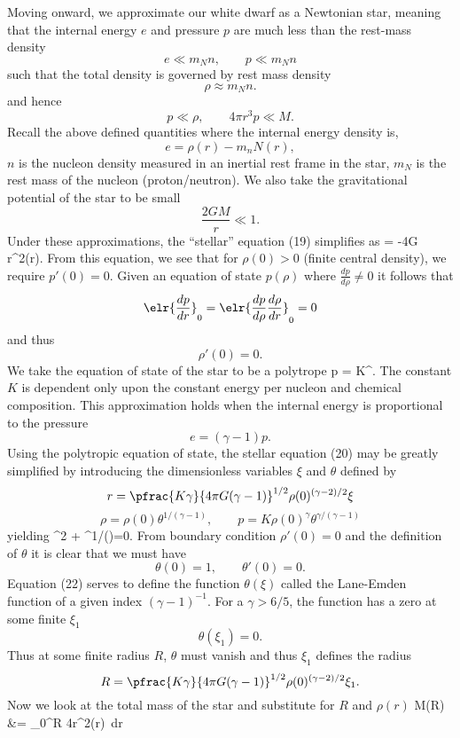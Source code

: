 \documentclass[10pt,letterpaper]{article}
\begin{document}
\\ \\Moving onward, we approximate our white dwarf as a Newtonian star, meaning that the internal energy $e$ and pressure $p$ are much less than the rest-mass density
\[
	e\ll m_N n,\qquad p \ll m_N n
\]
such that the total density is governed by rest mass density
\[
	\rho \approx m_N n.
\]
and hence
\[
	p \ll \rho,\qquad 4\pi r^3 p \ll M.
\]
Recall the above defined quantities where the internal energy density is,
\[
	e = \rho(r) - m_nN(r),
\]
$n$ is the nucleon density measured in an inertial rest frame in the star, $m_N$ is the rest mass of the nucleon (proton/neutron). We also take the gravitational potential of the star to be small
\[
	\frac{2GM}{r} \ll 1.
\]
Under these approximations, the ``stellar'' equation (19) simplifies as
\be
	 = -4\pi G r^2\rho(r).
\ee
From this equation, we see that for $\rho(0) >0$ (finite central density), we require $p'(0)=0$. Given an equation of state $p(\rho)$ where $\frac{dp}{d\rho}\ne 0$ it follows that
\[
	\elr{\frac{dp}{dr}}_0 =\elr{\frac{dp}{d\rho}\frac{d\rho}{dr}}_0= 0
\]
and thus
\[
	\rho'(0) = 0.
\]
We take the equation of state of the star to be a polytrope
\be
	p = K\rho^\gamma.
\ee
The constant $K$ is dependent only upon the constant energy per nucleon and chemical composition. This approximation holds when the internal energy is proportional to the pressure
\[
	e = (\gamma-1)p.
\]
Using the polytropic equation of state, the stellar equation (20) may be greatly simplified by introducing the dimensionless variables $\xi$ and $\theta$ defined by
\[
	r = \pfrac{ K\gamma}{4\pi G(\gamma-1)}^{1/2}\rho(0)^{(\gamma-2)/2}\xi
\]
\[
	\rho = \rho(0) \theta^{1/(\gamma-1)},\qquad p = K\rho(0)^\gamma \theta^{\gamma/(\gamma-1)}
\]
yielding
\be
	\xi^2 + \theta^{1/()}=0.
\ee
From boundary condition $\rho'(0) = 0$ and the definition of $\theta$ it is clear that we must have
\[
	\theta(0) = 1,\qquad \theta'(0) = 0.
\]
Equation (22) serves to define the function $\theta(\xi)$ called the Lane-Emden function of a given index $(\gamma-1)^{-1}$. For a $\gamma > 6/5$, the function has a zero at some finite $\xi_1$
\[
	\theta(\xi_1) = 0.
\]
Thus at some finite radius $R$, $\theta$ must vanish and thus $\xi_1$ defines the radius
\[
	R = \pfrac{ K\gamma}{4\pi G(\gamma-1)}^{1/2}\rho(0)^{(\gamma-2)/2}\xi_1.
\]
Now we look at the total mass of the star and substitute for $R$ and $\rho(r)$
\ba
	M(R) &= \int_0^R 4\pi r^2\rho(r)\ dr\\
\end{document}
